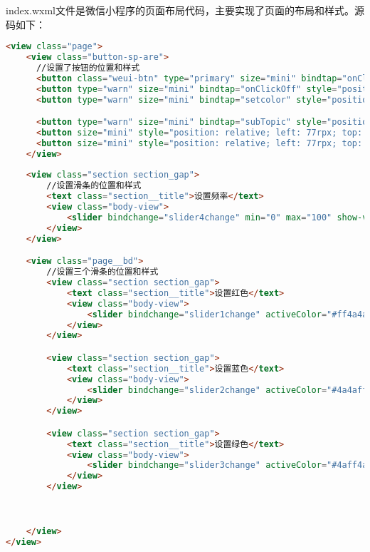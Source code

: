 \documentclass[12pt,hyperref,a4paper,UTF8]{ctexart}
\begin{document}
index.wxml文件是微信小程序的页面布局代码，主要实现了页面的布局和样式。源码如下：
\begin{lstlisting}[language=html]
  <view class="page">
    <view class="button-sp-are">
      //设置了按钮的位置和样式
      <button class="weui-btn" type="primary" size="mini" bindtap="onClickOpen" style="position: relative; left: 78rpx; top: 529rpx; width: 445rpx; height: 51rpx; display: inline-block; box-sizing: border-box">开灯</button>
      <button type="warn" size="mini" bindtap="onClickOff" style="position: relative; left: 77rpx; top: 400rpx; width: 445rpx; height: 51rpx; display: inline-block; box-sizing: border-box">关灯</button>
      <button type="warn" size="mini" bindtap="setcolor" style="position: relative; left: 77rpx; top: 270rpx; width: 445rpx; height: 51rpx; display: inline-block; box-sizing: border-box">设置</button>

      <button type="warn" size="mini" bindtap="subTopic" style="position: relative; left: 78rpx; top: 130rpx; width: 445rpx; height: 51rpx; display: inline-block; box-sizing: border-box">订阅</button>
      <button size="mini" style="position: relative; left: 77rpx; top: 144rpx; width: 445rpx; height: 51rpx; display: inline-block; box-sizing: border-box">温度：{{temperature}}℃</button>
      <button size="mini" style="position: relative; left: 77rpx; top: 20rpx; width: 445rpx; height: 51rpx; display: inline-block; box-sizing: border-box">光照：{{photores}}</button>
    </view>
  
    <view class="section section_gap">
        //设置滑条的位置和样式
        <text class="section__title">设置频率</text>
        <view class="body-view">
            <slider bindchange="slider4change" min="0" max="100" show-value />
        </view>
    </view>

    <view class="page__bd">
        //设置三个滑条的位置和样式
        <view class="section section_gap">
            <text class="section__title">设置红色</text>
            <view class="body-view">
                <slider bindchange="slider1change" activeColor="#ff4a4a"  min="0" max="255" show-value/>
            </view>
        </view>

        <view class="section section_gap">
            <text class="section__title">设置蓝色</text>
            <view class="body-view">
                <slider bindchange="slider2change" activeColor="#4a4aff" min="0" max="255" show-value/>
            </view>
        </view>

        <view class="section section_gap">
            <text class="section__title">设置绿色</text>
            <view class="body-view">
                <slider bindchange="slider3change" activeColor="#4aff4a" min="0" max="255" show-value/>
            </view>
        </view>
    


    </view>
</view>
\end{lstlisting}
\end{document}

